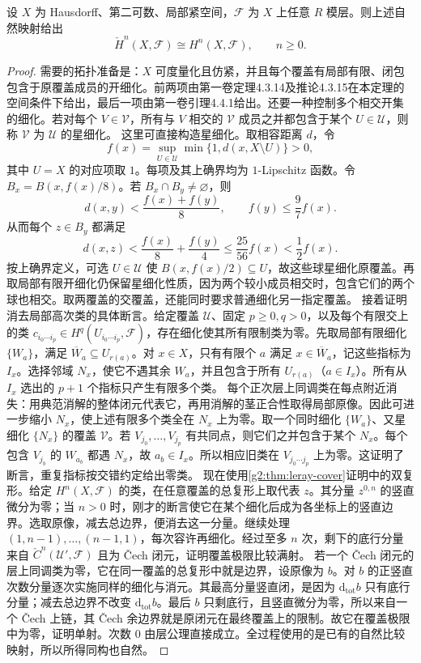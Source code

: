 \begin{theorem}\label{g2:thm:cech-sheaf-comparison}
	设 \(X\) 为 Hausdorff、第二可数、局部紧空间，\(\mathcal F\) 为 \(X\) 上任意 \(R\) 模层。则上述自然映射给出
	\[
		\check H^n(X,\mathcal F)\cong H^n(X,\mathcal F),\qquad n\ge0.
	\]
\end{theorem}
\begin{proof}
	需要的拓扑准备是：\(X\) 可度量化且仿紧，并且每个覆盖有局部有限、闭包包含于原覆盖成员的开细化。前两项由第一卷定理4.3.14及推论4.3.15在本定理的空间条件下给出，最后一项由第一卷引理4.4.1给出。还要一种控制多个相交开集的细化。若对每个 \(V\in\mathcal V\)，所有与 \(V\) 相交的 \(\mathcal V\) 成员之并都包含于某个 \(U\in\mathcal U\)，则称 \(\mathcal V\) 为 \(\mathcal U\) 的星细化。
	这里可直接构造星细化。取相容距离 \(d\)，令
	\[
		f(x)=\sup_{U\in\mathcal U}\min\{1,d(x,X\setminus U)\}>0,
	\]
	其中 \(U=X\) 的对应项取 \(1\)。每项及其上确界均为 \(1\)-Lipschitz 函数。令 \(B_x=B(x,f(x)/8)\)。若 \(B_x\cap B_y\ne\varnothing\)，则
	\[
		d(x,y)<\frac{f(x)+f(y)}8,\qquad f(y)\le\frac97f(x).
	\]
	从而每个 \(z\in B_y\) 都满足
	\[
		d(x,z)<\frac{f(x)}8+\frac{f(y)}4\le\frac{25}{56}f(x)<\frac12f(x).
	\]
	按上确界定义，可选 \(U\in\mathcal U\) 使 \(B(x,f(x)/2)\subseteq U\)，故这些球星细化原覆盖。再取局部有限开细化仍保留星细化性质，因为两个较小成员相交时，包含它们的两个球也相交。取两覆盖的交覆盖，还能同时要求普通细化另一指定覆盖。
	接着证明消去局部高次类的具体断言。给定覆盖 \(\mathcal U\)、固定 \(p\ge0,q>0\)，以及每个有限交上的类 \(c_{i_0\cdots i_p}\in H^q(U_{i_0\cdots i_p},\mathcal F)\)，存在细化使其所有限制类为零。先取局部有限细化 \(\{W_a\}\)，满足 \(\overline W_a\subseteq U_{r(a)}\)。对 \(x\in X\)，只有有限个 \(a\) 满足 \(x\in\overline W_a\)，记这些指标为 \(I_x\)。选择邻域 \(N_x\)，使它不遇其余 \(W_a\)，并且包含于所有 \(U_{r(a)}\)（\(a\in I_x\)）。所有从 \(I_x\) 选出的 \(p+1\) 个指标只产生有限多个类。
	每个正次层上同调类在每点附近消失：用典范消解的整体闭元代表它，再用消解的茎正合性取得局部原像。因此可进一步缩小 \(N_x\)，使上述有限多个类全在 \(N_x\) 上为零。取一个同时细化 \(\{W_a\}\)、又星细化 \(\{N_x\}\) 的覆盖 \(\mathcal V\)。若 \(V_{j_0},\ldots,V_{j_p}\) 有共同点，则它们之并包含于某个 \(N_x\)。每个包含 \(V_{j_b}\) 的 \(W_{a_b}\) 都遇 \(N_x\)，故 \(a_b\in I_x\)。所以相应旧类在 \(V_{j_0\cdots j_p}\) 上为零。这证明了断言，重复指标按交错约定给出零类。
	现在使用\cref{g2:thm:leray-cover}证明中的双复形。给定 \(H^n(X,\mathcal F)\) 的类，在任意覆盖的总复形上取代表 \(z\)。其分量 \(z^{0,n}\) 的竖直微分为零；当 \(n>0\) 时，刚才的断言使它在某个细化后成为各坐标上的竖直边界。选取原像，减去总边界，便消去这一分量。继续处理 \((1,n-1),\ldots,(n-1,1)\)，每次容许再细化。经过至多 \(n\) 次，剩下的底行分量来自 \(\check C^n(\mathcal U',\mathcal F)\) 且为 Čech 闭元，证明覆盖极限比较满射。
	若一个 Čech 闭元的层上同调类为零，它在同一覆盖的总复形中就是边界，设原像为 \(b\)。对 \(b\) 的正竖直次数分量逐次实施同样的细化与消元。其最高分量竖直闭，是因为 \(\mathrm d_{\mathrm{tot}}b\) 只有底行分量；减去总边界不改变 \(\mathrm d_{\mathrm{tot}}b\)。最后 \(b\) 只剩底行，且竖直微分为零，所以来自一个 Čech 上链，其 Čech 余边界就是原闭元在最终覆盖上的限制。故它在覆盖极限中为零，证明单射。次数 \(0\) 由层公理直接成立。全过程使用的是已有的自然比较映射，所以所得同构也自然。
\end{proof}

